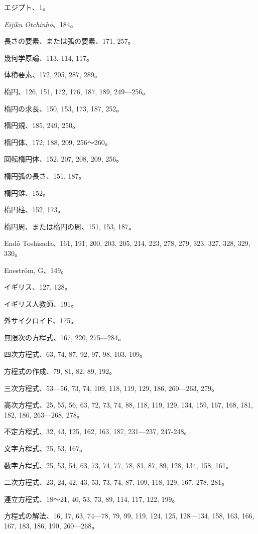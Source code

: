 \documentclass[11pt]{article}
\begin{document}
エジプト、1。\par
\emph{Eijiku Otchinhō}、184。\par
長さの要素、または弧の要素、171, 257。\par
幾何学原論、113, 114, 117。\par
体積要素、172, 205, 287, 289。\par
楕円、126, 151, 172, 176, 187, 189, 249—256。\par
楕円の求長、150, 153, 173, 187, 252。\par
楕円規、185, 249, 250。\par
楕円体、172, 188, 209, 256〜260。\par
回転楕円体、152, 207, 208, 209, 256。\par
楕円弧の長さ、151, 187。\par
楕円錐、152。\par
楕円柱、152, 173。\par
楕円周、または楕円の周、151, 153, 187。\par
Endō Toshisada、161, 191, 200, 203, 205, 214, 223, 278, 279, 323, 327, 328, 329, 330。\par
Eneström, G、149。\par
イギリス、127, 128。\par
イギリス人教師、191。\par
外サイクロイド、175。\par
無限次の方程式、167, 220, 275—284。\par
四次方程式、63, 74, 87, 92, 97, 98, 103, 109。\par
方程式の作成、79, 81, 82, 89, 192。\par
三次方程式、53—56, 73, 74, 109, 118, 119, 129, 186, 260—263, 279。\par
高次方程式、25, 55, 56, 63, 72, 73, 74, 88, 118, 119, 129, 134, 159, 167, 168, 181, 182, 186, 263—268, 278。\par
不定方程式、32, 43, 125, 162, 163, 187, 231—237, 247-248。\par
文字方程式、25, 53, 167。\par
数字方程式、25, 53, 54, 63, 73, 74, 77, 78, 81, 87, 89, 128, 134, 158, 161。\par
二次方程式、23, 24, 42, 43, 53, 73, 74, 87, 109, 118, 129, 167, 278, 281。\par
連立方程式、18〜21, 40, 53, 73, 89, 114, 117, 122, 199。\par
方程式の解法、16, 17, 63, 74—78, 79, 99, 119, 124, 125, 128—134, 158, 163, 166, 167, 183, 186, 190, 260—268。\par
\end{document}
